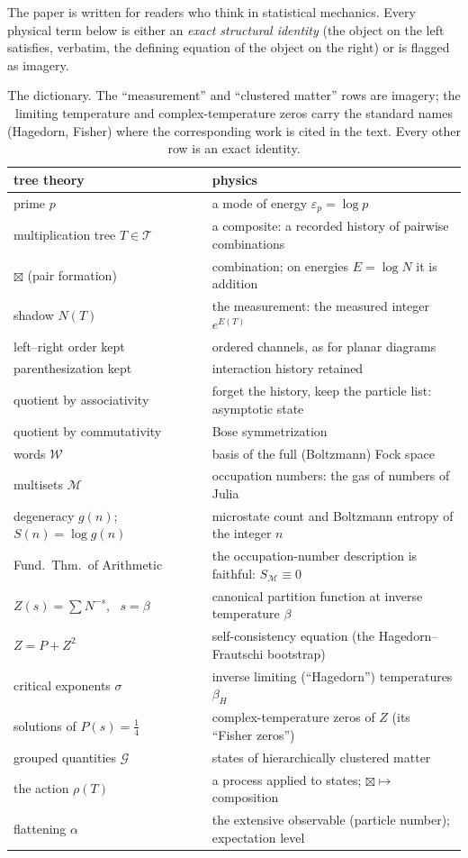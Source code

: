 \documentclass[11pt]{article}
\newcommand{\cT}{\mathcal{T}}   %
\newcommand{\cW}{\mathcal{W}}   %
\newcommand{\cM}{\mathcal{M}}   %
\newcommand{\cG}{\mathcal{G}}   %
\newcommand{\act}{\rho}
\numberwithin{equation}{section}
\theoremstyle{plain}
\theoremstyle{definition}
\theoremstyle{remark}
\begin{document}
The paper is written for readers who think in statistical mechanics. Every physical
term below is either an \emph{exact structural identity} (the object on the left
satisfies, verbatim, the defining equation of the object on the right) or is flagged
as imagery.

\begin{table}[ht]
\centering\small
\begin{tabular}{@{}ll@{}}
\toprule
tree theory & physics \\
\midrule
prime $p$ & a mode of energy $\varepsilon_p = \log p$ \\
multiplication tree $T \in \cT$ & a composite: a recorded history of pairwise combinations \\
$\boxtimes$ (pair formation) & combination; on energies $E = \log N$ it is addition \\
shadow $N(T)$ & the measurement: the measured integer $e^{E(T)}$ \\
left--right order kept & ordered channels, as for planar diagrams \\
parenthesization kept & interaction history retained \\
quotient by associativity & forget the history, keep the particle list: asymptotic state \\
quotient by commutativity & Bose symmetrization \\
words $\cW$ & basis of the full (Boltzmann) Fock space \\
multisets $\cM$ & occupation numbers: the gas of numbers of Julia \\
degeneracy $g(n)$; \ $S(n) = \log g(n)$ & microstate count and Boltzmann entropy of the integer $n$ \\
Fund.\ Thm.\ of Arithmetic & the occupation-number description is faithful: $S_\cM \equiv 0$ \\
$Z(s) = \sum N^{-s}$, \ $s = \beta$ & canonical partition function at inverse temperature $\beta$ \\
$Z = P + Z^2$ & self-consistency equation (the Hagedorn--Frautschi bootstrap) \\
critical exponents $\sigma$ & inverse limiting (``Hagedorn'') temperatures $\beta_H$ \\
solutions of $P(s) = \tfrac14$ & complex-temperature zeros of $Z$ (its ``Fisher zeros'') \\
grouped quantities $\cG$ & states of hierarchically clustered matter \\
the action $\act(T)$ & a process applied to states; $\boxtimes \mapsto$ composition \\
flattening $\alpha$ & the extensive observable (particle number); expectation level \\
\bottomrule
\end{tabular}
\caption{The dictionary. The ``measurement'' and ``clustered matter'' rows are
imagery; the limiting temperature and complex-temperature zeros carry the standard
names (Hagedorn, Fisher) where the corresponding work is cited in the text. Every
other row is an exact identity.}
\label{tab:dictionary}
\end{table}
\end{document}
